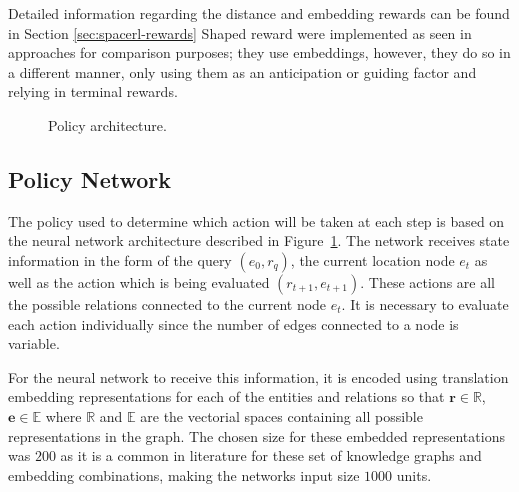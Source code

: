 Detailed information regarding the distance and embedding rewards can be found in Section \ref{sec:spacerl-rewards} Shaped reward were implemented as seen in approaches \cite{cui2023incorporating, lin2018multi} for comparison purposes; they use embeddings, however, they do so in a  different manner, only using them as an anticipation or guiding factor and relying in terminal rewards.

\begin{figure}[!h]
    \caption{Policy architecture.}
    \label{fig:policy}
\end{figure}

\subsection{Policy Network}
\label{sec:spacerl-policy}

The policy used to determine which action will be taken at each step is based on the neural network architecture described in Figure~\ref{fig:policy}. The network receives state information in the form of the query $(e_0,r_q)$, the current location node $e_t$ as well as the action which is being evaluated $(r_{t+1}, e_{t+1})$. These actions are all the possible relations connected to the current node $e_t$. It is necessary to evaluate each action individually since the number of edges connected to a node is variable.

For the neural network to receive this information, it is encoded using translation embedding representations for each of the entities and relations so that  $\textbf{r} \in \mathbb{R}$, $\textbf{e} \in \mathbb{E}$ where $\mathbb{R}$ and $\mathbb{E}$ are the vectorial spaces containing all possible representations in the graph. The chosen size for these embedded representations was $200$ as it is a common in literature for these set of knowledge graphs and embedding combinations, making the networks input size $1000$ units.

